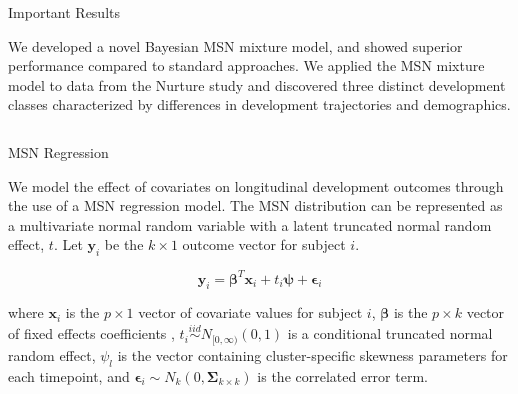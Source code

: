 \documentclass[final]{beamer}
\newlength{\onecolwid}
\newlength{\twocolwid}
\begin{document}
\begin{frame}[t]
\begin{columns}[t]
\begin{column}{\twocolwid}
\begin{alertblock}{Important Results}

We developed a novel Bayesian MSN mixture model, and showed superior performance compared to standard approaches. We applied the MSN mixture model to data from the Nurture study and discovered three distinct development classes characterized by differences in development trajectories and demographics.

\end{alertblock} 


\begin{columns}[t,totalwidth=\twocolwid] %

\begin{column}{\onecolwid} %


\begin{block}{MSN Regression}

We model the effect of covariates on longitudinal development outcomes through the use of a MSN regression model. The MSN distribution can be represented as a multivariate normal random variable with a latent truncated normal random effect, $t$. Let $\mathbf{y}_{i}$ be the $k \times 1$ outcome vector for subject $i$.

$$\mathbf{y}_{i} = \boldsymbol\beta^T \mathbf{x}_{i} + t_{i}\boldsymbol\psi + \boldsymbol\epsilon_{i}$$

where $\mathbf{x}_i$ is the $p \times 1$ vector of covariate values for subject $i$, $\boldsymbol\beta$ is the $p \times k$ vector of fixed effects coefficients , $t_i \stackrel{iid}{\sim} N_{[0,\infty)}(0,1)$ is a conditional truncated normal random effect, $\psi_l$ is the vector containing cluster-specific skewness parameters for each timepoint, and $\boldsymbol\epsilon_i \sim N_k(0,\boldsymbol\Sigma_{k \times k})$ is the correlated error term.

\end{block}


\end{column} %


\end{columns}
\end{column}
\end{columns}
\end{frame}
\end{document}
